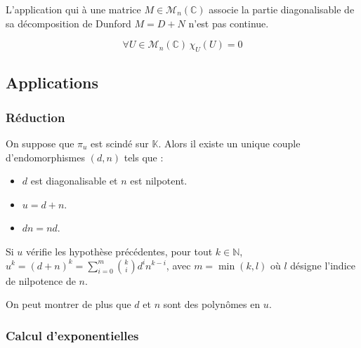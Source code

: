 	\begin{application}
		L'application qui à une matrice $M \in \mathcal{M}_n(\mathbb{C})$ associe la partie diagonalisable de sa décomposition de Dunford $M = D + N$ n'est pas continue.
	\end{application}
	
	
	\begin{application}
		\[ \forall U \in \mathcal{M}_n(\mathbb{C}) \, \chi_U(U) = 0 \]	
	\end{application}
	
	\subsection{Applications}
	
	\subsubsection{Réduction}
	
	
	\begin{theorem}
		On suppose que $\pi_u$ est scindé sur $\mathbb{K}$. Alors il existe un unique couple d'endomorphismes $(d, n)$ tels que :
		\begin{itemize}
			\item $d$ est diagonalisable et $n$ est nilpotent.
			\item $u = d + n$.
			\item $d n = n d$.
		\end{itemize}
	\end{theorem}
	
	\begin{corollary}
		Si $u$ vérifie les hypothèse précédentes, pour tout $k \in \mathbb{N}$, $u^k = (d + n)^k = \sum_{i=0}^m \binom{k}{i} d^i n^{k-i}$, avec $m = \min(k, l)$ où $l$ désigne l'indice de nilpotence de $n$.
	\end{corollary}
	
	\begin{remark}
		On peut montrer de plus que $d$ et $n$ sont des polynômes en $u$.
	\end{remark}
	
	\subsubsection{Calcul d'exponentielles}
	
